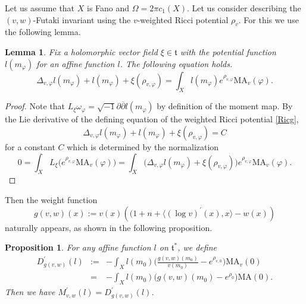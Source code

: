 \documentclass[12pt]{amsart}
\numberwithin{equation}{section}%
\theoremstyle{plain}
\newtheorem{lemma}[theorem]{Lemma}
\newtheorem{proposition}[theorem]{Proposition}
\theoremstyle{definition}
\newcommand{\deldel}{\sqrt{-1}\partial \overline{\partial}}
\newcommand{\MA}{\mathrm{MA}}
\renewcommand{\phi}{\varphi}
\newcommand{\1}{\mathbf{1}}
\begin{document}
Let us assume that $X$ is Fano and $\Omega=2\pi c_{1}(X)$.
Let us consider describing the $(v,w)$-Futaki invariant
using the $v$-weighted Ricci potential $\rho_{v}$.
For this we use the following lemma.
\begin{lemma}\label{Deltal}
Fix a holomorphic vector field $\xi\in\mathfrak{t}$
with the potential function $l(m_{\phi})$ for an affine function $l$.
The following equation holds.
\begin{equation}
\Delta_{v,\phi}l(m_{\phi})+l(m_{\phi})+\xi(\rho_{v,\phi})
=\int_{X}l(m_{\phi})e^{\rho_{v,\phi}}\MA_{v}(\phi).
\end{equation}
\end{lemma}
\begin{proof}
Note that $L_{\xi}\omega_{\phi}=\deldel l(m_{\phi})$
by definition of the moment map.
By the Lie derivative of the defining equation
of the weighted Ricci potential \eqref{Ricg},
\begin{equation}
\Delta_{v,\phi}l(m_{\phi})+l(m_{\phi})+\xi(\rho_{v,\phi})=C
\end{equation}
for a constant $C$ which is determined by the normalization 
\begin{equation}
0=\int_{X}L_{\xi}\Big(e^{\rho_{v,\phi}}\MA_{v}(\phi)\Big)
=\int_{X}\Big(\Delta_{v,\phi}l(m_{\phi})+\xi(\rho_{v,\phi})\Big)
e^{\rho_{v,\phi}}\MA_{v}(\phi).
\end{equation}
\end{proof}

Then the weight function
\begin{equation}\label{g(v,w)}
g(v,w)(x):=v(x)\left((1+n+\langle(\log v)^{\prime}(x),x\rangle -w(x)\right)
\end{equation}
naturally appears,
as shown in the following proposition.

\begin{proposition}\label{FutMD}
For any affine function $l$ on $\mathfrak{t}^{*}$, we define
\begin{eqnarray}
D^{\prime}_{g(v,w)}(l)&:=&-\int_{X}l(m_{0})\Big(\frac{g(v,w)(m_{0})}{v(m_{0})}
-e^{\rho_{v,0}}\Big)\MA_{v}(0) \\
&=&-\int_{X}l(m_{0})\Big(g(v,w)(m_{0})-e^{\rho_{0}}\Big)\MA(0).
\end{eqnarray}
Then we have
$M^{\prime}_{v,w}(l)=D^{\prime}_{g(v,w)}(l)$.
\end{proposition}
\end{document}
